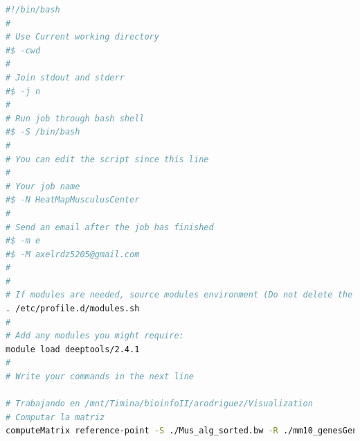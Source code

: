 \documentclass[
]{article}
\begin{document}
\begin{lstlisting}[language=bash]
#!/bin/bash
#
# Use Current working directory
#$ -cwd
#
# Join stdout and stderr
#$ -j n
#
# Run job through bash shell
#$ -S /bin/bash
#
# You can edit the script since this line
#
# Your job name
#$ -N HeatMapMusculusCenter
#
# Send an email after the job has finished
#$ -m e
#$ -M axelrdz5205@gmail.com
#
#
# If modules are needed, source modules environment (Do not delete the next line):
. /etc/profile.d/modules.sh
#
# Add any modules you might require:
module load deeptools/2.4.1
#
# Write your commands in the next line

# Trabajando en /mnt/Timina/bioinfoII/arodriguez/Visualization
# Computar la matriz
computeMatrix reference-point -S ./Mus_alg_sorted.bw -R ./mm10_genesGencodeVM23.bed -p max/2 --referencePoint TSS -a 2000 -b 2000 -out matrix_M_CEBPA_ChIP.tab.gz
\end{lstlisting}
\end{document}
